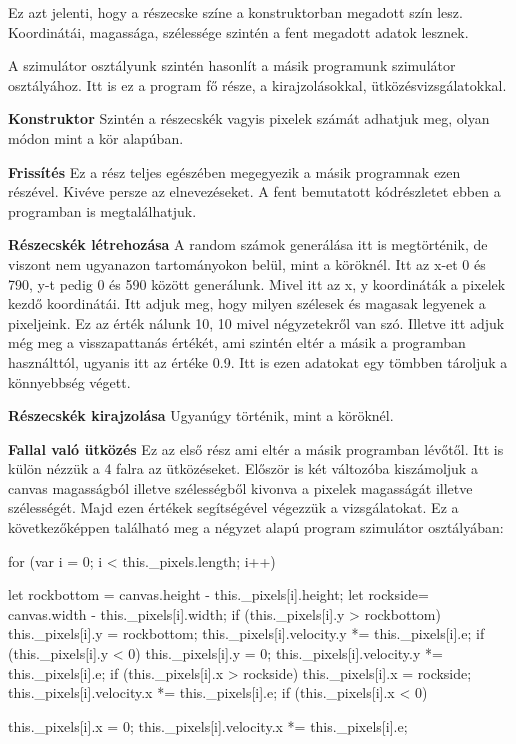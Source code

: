 Ez azt jelenti, hogy a részecske színe a konstruktorban megadott szín lesz. Koordinátái, magassága, szélessége szintén a fent megadott adatok lesznek.



A szimulátor osztályunk szintén hasonlít a másik programunk szimulátor osztályához. Itt is ez a program fő része, a kirajzolásokkal, ütközésvizsgálatokkal. 

\textbf{Konstruktor}
Szintén a részecskék vagyis pixelek számát adhatjuk meg, olyan módon mint a kör alapúban.

\textbf{Frissítés}
Ez a rész teljes egészében megegyezik a másik programnak ezen részével. Kivéve persze az elnevezéseket. A fent bemutatott kódrészletet ebben a programban is megtalálhatjuk.

\textbf{Részecskék létrehozása}
A random számok generálása itt is megtörténik, de viszont nem ugyanazon tartományokon belül, mint a köröknél. Itt az x-et 0 és 790, y-t pedig 0 és 590 között generálunk. Mivel itt az x, y koordináták a pixelek kezdő koordinátái. Itt adjuk meg, hogy milyen szélesek és magasak legyenek a pixeljeink. Ez az érték nálunk 10, 10 mivel négyzetekről van szó. Illetve itt adjuk még meg a visszapattanás értékét, ami szintén eltér a másik a programban használttól, ugyanis itt az értéke 0.9. Itt is ezen adatokat egy tömbben tároljuk a könnyebbség végett. 

\textbf{Részecskék kirajzolása}
Ugyanúgy történik, mint a köröknél. 

\textbf{Fallal való ütközés}
Ez az első rész ami eltér a másik programban lévőtől. Itt is külön nézzük a 4 falra az ütközéseket. Először is két változóba kiszámoljuk a canvas magasságból illetve szélességből kivonva a pixelek magasságát illetve szélességét. Majd ezen értékek segítségével végezzük a vizsgálatokat. Ez a következőképpen található meg a négyzet alapú program szimulátor osztályában:
\begin{java}
for (var i = 0; i < this._pixels.length; i++) 
{
  let rockbottom = canvas.height - this._pixels[i].height;
  let rockside= canvas.width - this._pixels[i].width;
  if (this._pixels[i].y > rockbottom) 
  {
    this._pixels[i].y = rockbottom;
    this._pixels[i].velocity.y *= this._pixels[i].e;
  }
  if (this._pixels[i].y < 0)
  {
    this._pixels[i].y = 0;
    this._pixels[i].velocity.y *= this._pixels[i].e;
  }
  if (this._pixels[i].x > rockside) 
  {
    this._pixels[i].x = rockside;
    this._pixels[i].velocity.x *= this._pixels[i].e;
  }
  if (this._pixels[i].x < 0)
  {
    this._pixels[i].x = 0;
    this._pixels[i].velocity.x *= this._pixels[i].e;
			
  }
		
}
\end{java}
 

